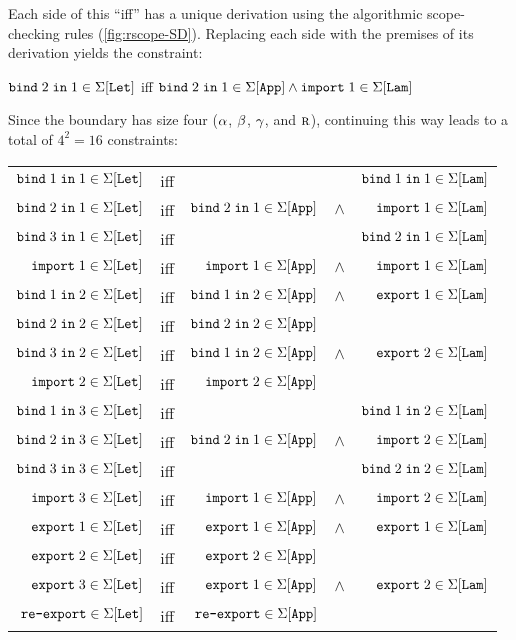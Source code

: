 Each side of this ``iff'' has a unique derivation using the
algorithmic scope-checking rules (\cref{fig:rscope-SD}).
Replacing each side with the premises of its derivation
yields the constraint:
\begin{Table}
  $\SigBindRm{Let}{1}{2}$ iff $\SigBindRm{App}{1}{2} \wedge \SigImptRm{Lam}{1}$
\end{Table}

Since the boundary has size four ($\PVarA$, $\PVarB$, $\PVarC$, and $\Root$),
continuing this way leads to a total of $4^2=16$ constraints:
\begin{center}\begin{tabular}
  {r @{\;\;} c @{\;\;} r @{\,} c @{\,} r}

  $\SigBindRm{Let}{1}{1}$
  &iff& && $\SigBindRm{Lam}{1}{1}$ \\

  $\SigBindRm{Let}{1}{2}$
  &iff& $\SigBindRm{App}{1}{2}$ &$\wedge$& $\SigImptRm{Lam}{1}$ \\

  $\SigBindRm{Let}{1}{3}$
  &iff& && $\SigBindRm{Lam}{1}{2}$ \\

  $\SigImptRm{Let}{1}$
  &iff& $\SigImptRm{App}{1}$ &$\wedge$& $\SigImptRm{Lam}{1}$ \\

  $\SigBindRm{Let}{2}{1}$
  &iff& $\SigBindRm{App}{2}{1}$ &$\wedge$& $\SigExptRm{Lam}{1}$ \\

  $\SigBindRm{Let}{2}{2}$
  &iff& $\SigBindRm{App}{2}{2}$ && \\

  $\SigBindRm{Let}{2}{3}$
  &iff& $\SigBindRm{App}{2}{1}$ &$\wedge$& $\SigExptRm{Lam}{2}$ \\

  $\SigImptRm{Let}{2}$
  &iff& $\SigImptRm{App}{2}$ && \\

  $\SigBindRm{Let}{3}{1}$
  &iff& && $\SigBindRm{Lam}{2}{1}$ \\

  $\SigBindRm{Let}{3}{2}$
  &iff& $\SigBindRm{App}{1}{2}$ &$\wedge$& $\SigImptRm{Lam}{2}$ \\

  $\SigBindRm{Let}{3}{3}$
  &iff& && $\SigBindRm{Lam}{2}{2}$ \\

  $\SigImptRm{Let}{3}$
  &iff& $\SigImptRm{App}{1}$ &$\wedge$& $\SigImptRm{Lam}{2}$ \\

  $\SigExptRm{Let}{1}$
  &iff& $\SigExptRm{App}{1}$ &$\wedge$& $\SigExptRm{Lam}{1}$ \\

  $\SigExptRm{Let}{2}$
  &iff& $\SigExptRm{App}{2}$ && \\
  
  $\SigExptRm{Let}{3}$
  &iff& $\SigExptRm{App}{1}$ &$\wedge$& $\SigExptRm{Lam}{2}$ \\
  
  $\SigSelfRm{Let}$
  &iff& $\SigSelfRm{App}$ && \\
\end{tabular}\end{center}

